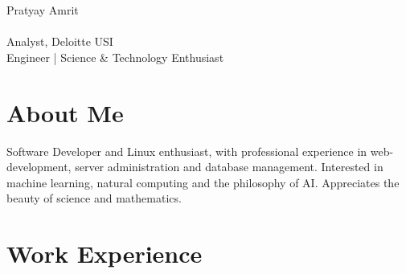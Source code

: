 \documentclass[10pt]{article} %
\begin{document}
\begin{paracol}{2} %


\parbox[top][0.12\textheight][c]{\linewidth}{ %
	\vspace{-0.04\textheight} %
	{\sffamily\Huge Pratyay Amrit}\\\medskip %
    \\\medskip
	{\sffamily\LARGE\color{headings} Analyst, Deloitte USI}\\\medskip
    {\sffamily\Large\color{headings} Engineer | Science \& Technology Enthusiast}
}


\section{About Me}

Software Developer and Linux enthusiast, with professional experience in web-development, server administration and database management. Interested in machine learning, natural computing and the philosophy of AI. Appreciates the beauty of science and mathematics.

\medskip %


\section{Work Experience}




\end{paracol}
\end{document}
